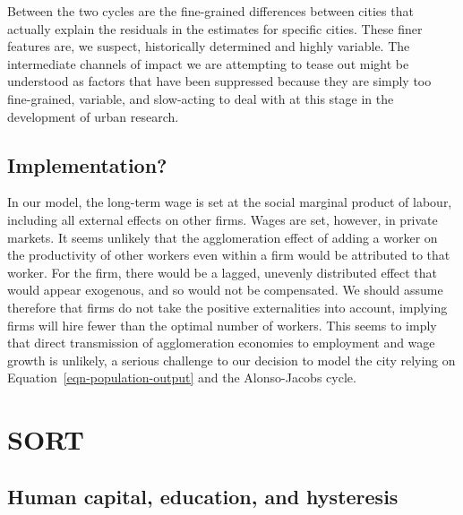 Between the two cycles are the fine-grained differences between cities that actually explain the residuals in the estimates for specific cities. These finer features are, we suspect, historically determined and highly variable. The intermediate channels of impact we are attempting to tease out %
might be understood as factors that have been suppressed because they are simply too fine-grained, variable, and slow-acting  to deal with at this stage in the development of urban research.


\subsection{Implementation?}

In our model, the long-term wage is set at the social marginal product of labour, including all external effects on other firms. Wages are set, however, in private markets. It seems unlikely that the agglomeration effect of adding a worker on the productivity of other workers even within a firm would be attributed to that worker. For the firm, there would be a lagged, unevenly distributed effect that would appear exogenous, and so would not be compensated. 
We should assume therefore that firms do not take the positive externalities into account, implying firms will hire fewer than the optimal number of workers. 
This seems to imply that direct transmission of agglomeration economies to employment and wage growth is unlikely,  a serious challenge to our decision to model the city relying on Equation~\ref{eqn-population-output} and the  Alonso-Jacobs cycle.

\section{SORT}
\subsection{Human capital, education, and hysteresis}

